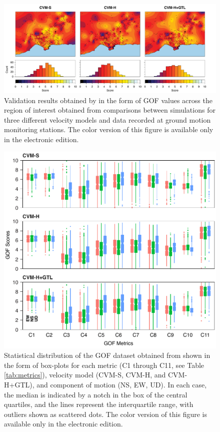 \begin{figure}[t]
    \centering
    \includegraphics[width=\textwidth]{figures/pdf/figure-02}
    \caption{Validation results obtained by \citet{Taborda_2014_BSSA} in the form of GOF values across the region of interest obtained from comparisons between simulations for three different velocity models and data recorded at ground motion monitoring stations. The color version of this figure is available only in the electronic edition.}
    \label{fig:ref-gof-maps}
\end{figure}
% 
\begin{figure}[ht!]
    \centering
    \includegraphics[width=\columnwidth]{figures/pdf/figure-03}
    \caption{Statistical distribution of the GOF dataset obtained from \citet{Taborda_2014_BSSA} shown in the form of box-plots for each metric (C1 through C11, see Table \ref{tab:metrics}), velocity model (CVM-S, CVM-H, and CVM-H+GTL), and component of motion (NS, EW, UD). In each case, the median is indicated by a notch in the box of the central quartiles, and the lines represent the interquartile range, with outliers shown as scattered dots. The color version of this figure is available only in the electronic edition.}
    \label{fig:data-box-plot}
\end{figure}


